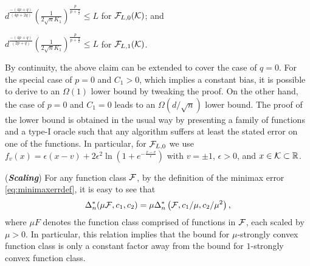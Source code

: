 \begin{inparaenum}[\bfseries (i)]
\item $d^{\frac{-(4p+q)}{(4p+2q)}}\left(\frac{1}{2\sqrt{n} K_1} \right)^{\frac{p}{p+\frac{q}{2}}}\le L$ for $\mathcal{F}_{L,0}(\mathcal{K})$; and\\
\item $d^{\frac{-(4p+q)}{(2p+q)}}\left(\frac{1}{2\sqrt{n} K_1} \right)^{\frac{p}{p+\frac{q}{2}}} \le L$ for $\mathcal{F}_{L,1}(\mathcal{K})$.
\end{inparaenum}

By continuity, the above claim can be extended to cover the case of $q=0$. For the special case of $p=0$ and $C_1>0$, which implies a constant bias, it is possible to derive to an $\Omega(1)$ lower bound by tweaking the proof. On the other hand, the case of $p=0$ and $C_1=0$ leads to an $\Omega(d/\sqrt{n})$ lower bound. The proof of the lower bound is obtained in the usual way by presenting a family of functions and a type-I oracle such that any algorithm suffers at least the stated error on one of the functions. In particular, for $\mathcal{F}_{L,0}$ we use
$f_v(x)=\epsilon\left( x-v\right)+2\epsilon^2 \ln\left(1+e^{-\frac{x-v}{\epsilon}}  \right)$ with $v=\pm 1$, $\epsilon>0$, and $x \in \mathcal{K} \subset \mathbb{R}$.


\begin{remark}(\textbf{\textit{Scaling}})
For any function class $\mathcal{F}$, by the definition of the minimax error \eqref{eq:minimaxerrdef}, it is easy to see that
$$\Delta_n^*(\mu \mathcal{F}, c_1,c_2) = \mu \Delta_n^*\left(\mathcal{F}, c_1/\mu,c_2/\mu^2\right),$$
 where $\mu F$ denotes the function class comprised of functions in $\mathcal{F}$, each scaled by $\mu>0$. In particular, this relation implies that the bound for $\mu$-strongly convex function class is only a constant factor away from the bound for $1$-strongly convex function class.
\end{remark}


